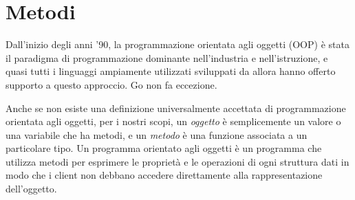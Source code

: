 \documentclass[../thesis.tex]{subfiles}
\begin{document}
    \newpage


    \section{Metodi}\label{sec:metodi}
    Dall'inizio degli anni '90, la programmazione orientata agli oggetti (OOP) è stata il paradigma di programmazione dominante nell'industria e nell'istruzione, e quasi tutti i linguaggi ampiamente utilizzati sviluppati da allora hanno offerto supporto a questo approccio.
    Go non fa eccezione.
    \hfill \vspace{12pt}

    Anche se non esiste una definizione universalmente accettata di programmazione orientata agli oggetti, per i nostri scopi, un \textit{oggetto} è semplicemente un valore o una variabile che ha metodi, e un \textit{metodo} è una funzione associata a un particolare tipo.
    Un programma orientato agli oggetti è un programma che utilizza metodi per esprimere le proprietà e le operazioni di ogni struttura dati in modo che i client non debbano accedere direttamente alla rappresentazione dell'oggetto.
    
    
    
    
    
    \clearpage
\end{document}
